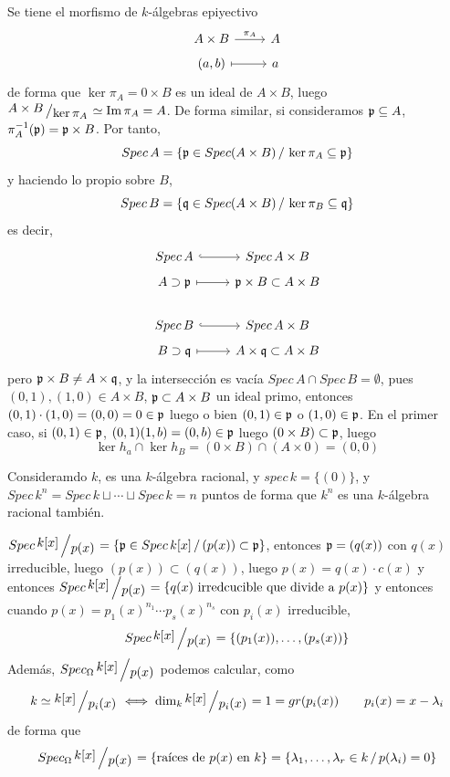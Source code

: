 \begin{dem}
    Se tiene el morfismo de $k$-\'algebras epiyectivo
    $$\bt A\times B \rar{\pi_A} & A \\[-5mm] (a,b) \rarmaps & a \et$$
    de forma que $\ker \pi_A = 0 \times B$ es un ideal de $A \times B$, luego $\modulo{A\times B}{\ker \pi_A} \simeq \Im \pi_A = A$. De forma similar, si consideramos $\mathfrak{p} \subseteq A$, $\pi_A^{-1}(\mathfrak{p}) = \mathfrak{p} \times B$. Por tanto, 
    $$Spec \, A = \{ \mathfrak{p} \in Spec(A\times B) \, / \, \ker \pi_A \subseteq \mathfrak{p}\}$$
    y haciendo lo propio sobre $B$,
    $$Spec \, B = \{ \mathfrak{q} \in Spec(A\times B) \, / \, \ker \pi_B \subseteq \mathfrak{q}\}$$
    es decir, 
    $$\bt Spec \, A \arrow[hook]{r} & Spec \, A\times B \\[-5mm] A \supset \p \rarmaps & \p \times B \subset A \times B \\  Spec \, B \arrow[hook]{r} & Spec \, A\times B \\[-5mm] B \supset \q \rarmaps & A \times \q \subset A \times B\et$$
    pero $\mathfrak{p} \times B \neq A \times \mathfrak{q}$, y la intersecci\'on es vac\'ia $Spec\, A \cap Spec\, B = \emptyset$, pues $(0,1),(1,0) \in A\times B$, $\mathfrak{p} \subset A\times B$ un ideal primo, entonces $(0,1) \cdot (1,0) = (0,0) = 0 \in \mathfrak{p}$ luego o bien $(0,1)\in \mathfrak{p}$ o $(1,0)\in \mathfrak{p}$. En el primer caso, si $(0,1) \in \mathfrak{p}$, $(0,1 )(1,b) = (0,b) \in \mathfrak{p} $ luego $(0 \times B) \subset \mathfrak{p}$, luego
    $$ \ker h_a \cap \ker h_B = (0\times B) \cap (A \times 0 ) = (0,0) $$
\end{dem}
\begin{ejem}
    Consideramdo $k$, es una $k$-\'algebra racional, y $spec\, k = \{(0)\}$, y $Spec \, k^n = Spec \, k \sqcup \cdots \sqcup Spec\, k= n \text{ puntos}$ de forma que $k^n$ es una $k$-\'algebra racional tambi\'en. 
\end{ejem}\begin{ejem}
    $Spec\, \modulo{k[x]}{p(x)} = \{\p \in Spec\, k[x] \, / \, (p(x)) \subset \p\}$, entonces $\mathfrak{p} = (q(x))$ con $q(x)$ irreducible, luego $(p(x)) \subset (q(x))$, luego $p(x) = q(x) \cdot c(x)$ y entonces $Spec\, \modulo{k[x]}{p(x)} = \{q(x) \text{ irredcucible que divide a } p(x)\}$ y entonces cuando $p(x) = p_1(x)^{n_1} \cdots  p_s(x)^{n_s}$ con $p_i(x)$ irreducible, 
    $$Spec\, \modulo{k[x]}{p(x)} = \{(p_1(x)) , \ldots, (p_s(x))\}$$
    Adem\'as, $Spec_{\Omega}\, \modulo{k[x]}{p(x)}$ podemos calcular, como 
    $$ k \simeq \modulo{k[x]}{p_i(x)} \iff \dim_k \modulo{k[x]}{p_i(x)} = 1 = gr(p_i(x)) \qquad p_i(x) = x-\lambda_i$$
    de forma que $$Spec_{\Omega}\, \modulo{k[x]}{p(x)} = \{\text{ra\'ices de } p(x) \text{ en } k\} = \{\lambda_1, \ldots, \lambda_r \in k \, / \, p(\lambda_i) = 0\}$$
\end{ejem}
